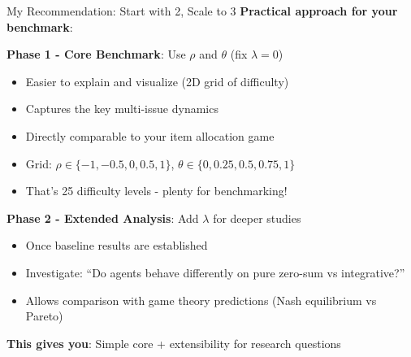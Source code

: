 \documentclass{beamer}
\begin{document}
\begin{frame}{My Recommendation: Start with 2, Scale to 3}
\textbf{Practical approach for your benchmark}:

\vspace{0.5cm}

\textbf{Phase 1 - Core Benchmark}: Use $\rho$ and $\theta$ (fix $\lambda = 0$)
\begin{itemize}
    \item Easier to explain and visualize (2D grid of difficulty)
    \item Captures the key multi-issue dynamics
    \item Directly comparable to your item allocation game
    \item Grid: $\rho \in \{-1, -0.5, 0, 0.5, 1\}$, $\theta \in \{0, 0.25, 0.5, 0.75, 1\}$
    \item That's 25 difficulty levels - plenty for benchmarking!
\end{itemize}

\vspace{0.5cm}

\textbf{Phase 2 - Extended Analysis}: Add $\lambda$ for deeper studies
\begin{itemize}
    \item Once baseline results are established
    \item Investigate: ``Do agents behave differently on pure zero-sum vs integrative?''
    \item Allows comparison with game theory predictions (Nash equilibrium vs Pareto)
\end{itemize}

\vspace{0.3cm}

\textbf{This gives you}: Simple core + extensibility for research questions
\end{frame}
\end{document}
